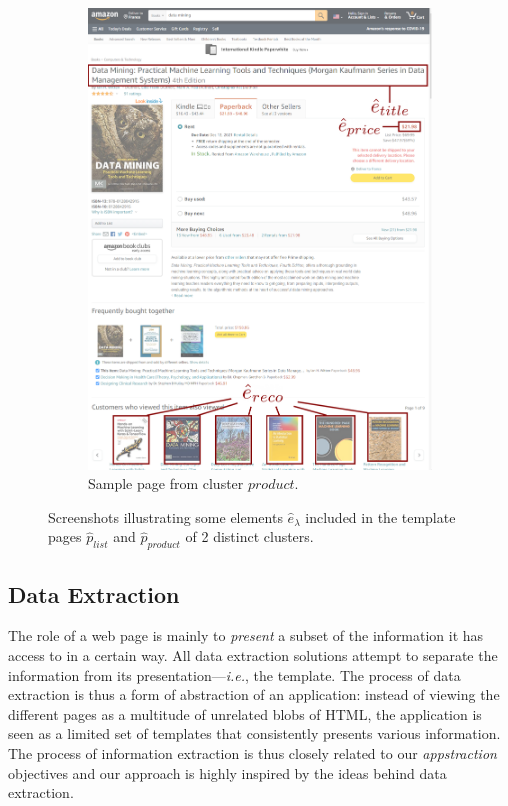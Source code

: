 \begin{figure}[ht]
\begin{subfigure}{.35\textwidth}
    \includegraphics[width=\linewidth]{appstract/amazon_b.png}
    \caption{Sample page from cluster $product$.}
    \label{fig:amazon_b}
  \end{subfigure}
  \caption{Screenshots illustrating some elements $\hat{e}_{\lambda}$ included in the template pages $\hat{p}_{list}$ and $\hat{p}_{product}$ of 2 distinct clusters.}
  \label{fig:amazon}
\end{figure}

\subsection{Data Extraction}
The role of a web page is mainly to \emph{present} a subset of the information it has access to in a certain way.
All data extraction solutions attempt to separate the information from its presentation---\emph{i.e.}, the template.
The process of data extraction is thus a form of abstraction of an application: instead of viewing the different pages as a multitude of unrelated blobs of HTML, the application is seen as a limited set of templates that consistently presents various information.
The process of information extraction is thus closely related to our \emph{appstraction} objectives and our approach is highly inspired by the ideas behind data extraction. 

